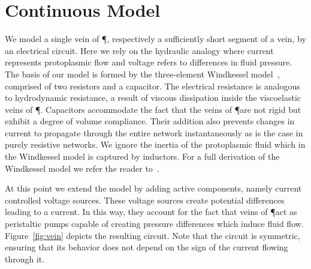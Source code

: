 

\section{Continuous Model}\label{sec:continuous}

  We model a single vein of \P, respectively a sufficiently short segment of a vein, by an electrical circuit. Here we rely on the hydraulic analogy where current represents protoplasmic flow and voltage refers to differences in fluid pressure. The basis of our model is formed by the three-element Windkessel model~\cite{hales1733statical,frank1899grundform}, comprised of two resistors and a capacitor. The electrical resistance is analogous to hydrodynamic resistance, a result of viscous dissipation inside the viscoelastic veins of \P. Capacitors accommodate the fact that the veins of \P are not rigid but exhibit a degree of volume compliance. Their addition also prevents changes in current to propagate through the entire network instantaneously as is the case in purely resistive networks. We ignore the inertia of the protoplasmic fluid which in the Windkessel model is captured by inductors. For a full derivation of the Windkessel model we refer the reader to~\cite{olufsen2004deriving}.

  At this point we extend the model by adding active components, namely current controlled voltage sources. These voltage sources create potential differences leading to a current. In this way, they account for the fact that veins of \P act as peristaltic pumps capable of creating pressure differences which induce fluid flow. Figure~\ref{fig:vein} depicts the resulting circuit. Note that the circuit is symmetric, ensuring that its behavior does not depend on the sign of the current flowing through it. 


